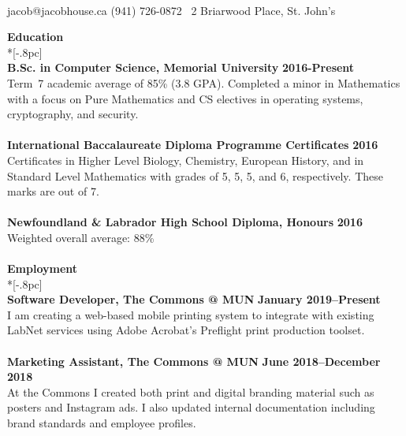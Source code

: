 \documentclass[letterpaper]{article}
\let\dateshape\bf
\begin{document}
\vspace*{-2.75pc}
\begin{center}
	\scalebox{1.2}{\Huge Jacob W.F. House} \\[.75pc]
	{\Large{}} jacob@jacobhouse.ca \quad 
	{\Large{}} (941) 726-0872 \quad
	\faHome\ 2 Briarwood Place, St. John's
	\\[2pc]
\end{center}

{\large \bf Education} \\*[-.8pc]
\underline{\hspace{\textwidth}} \\[0.5pc]
{\bf B.Sc. in Computer Science, Memorial University} \hfill {\dateshape 2016-Present} \\
Term~7 academic average of 85\% (3.8 GPA). Completed a minor in Mathematics with a focus on Pure Mathematics and CS electives in operating systems, cryptography, and security. \\
\\
{\bf International Baccalaureate Diploma Programme Certificates} \hfill {\dateshape 2016} \\
Certificates in Higher Level Biology, Chemistry, European History, and in Standard 
Level Mathematics with grades of 5, 5, 5, and 6, respectively. These marks are out of 7. \\
\\
{\bf Newfoundland \& Labrador High School Diploma, Honours} \hfill {\dateshape 2016} \\
Weighted overall average: 88\% \\
\\[0.5pc]
{\large \bf Employment} \\*[-.8pc]
\underline{\hspace{\textwidth}} \\[0.5pc]
{\bf Software Developer, The Commons @ MUN } \hfill {\dateshape January 2019--Present\/} \\
I am creating a web-based mobile printing system to integrate with existing LabNet
services using Adobe Acrobat's Preflight print production toolset. \\
\\
{\bf Marketing Assistant, The Commons @ MUN } \hfill {\dateshape June 2018--December 2018\/} \\
At the Commons I created both print and digital branding material such as posters and Instagram 
ads. I also updated internal documentation including brand standards and employee profiles. \\
\end{document}
